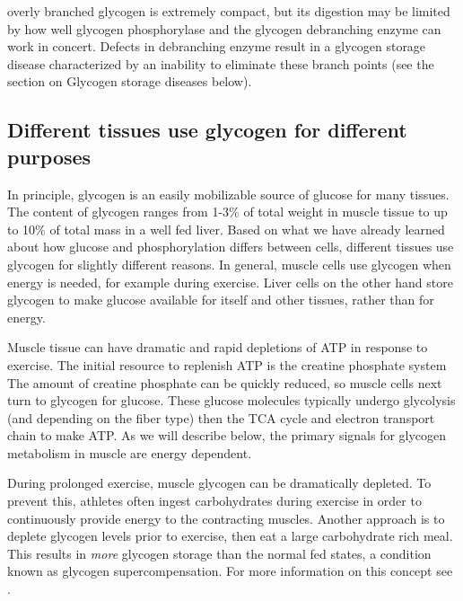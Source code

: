 \documentclass{tufte-handout}
\begin{document}
 overly branched glycogen is extremely compact, but its digestion may be limited by how well glycogen phosphorylase and the glycogen debranching enzyme can work in concert.  Defects in debranching enzyme result in a glycogen storage disease characterized by an inability to eliminate these branch points (see the section on Glycogen storage diseases below).

\subsection{Different tissues use glycogen for different purposes}

In principle, glycogen is an easily mobilizable source of glucose for many tissues.  The content of glycogen ranges from 1-3\% of total weight in muscle tissue to up to 10\% of total mass in a well fed liver.  Based on what we have already learned about how glucose and phosphorylation differs between cells, different tissues use glycogen for slightly different reasons.  In general, muscle cells use glycogen when energy is needed, for example during exercise.  Liver cells on the other hand store glycogen to make glucose available for itself and other tissues, rather than for energy.

   Muscle tissue can have dramatic and rapid depletions of ATP in response to exercise.  The initial resource to replenish ATP is the creatine phosphate system  The amount of creatine phosphate can be quickly reduced, so muscle cells next turn to glycogen for glucose.  These glucose molecules typically undergo glycolysis (and depending on the fiber type) then the TCA cycle and electron transport chain to make ATP. As we will describe below, the primary signals for glycogen metabolism in muscle are energy dependent.

  During prolonged exercise, muscle glycogen can be dramatically depleted.  To prevent this, athletes often ingest carbohydrates during exercise in order to continuously provide energy to the contracting muscles.  Another approach is to deplete glycogen levels prior to exercise, then eat a large carbohydrate rich meal.  This results in \emph{more} glycogen storage than the normal fed states, a condition known as glycogen supercompensation.  For more information on this concept see \citet{Hawley1997}.  
\end{document}
